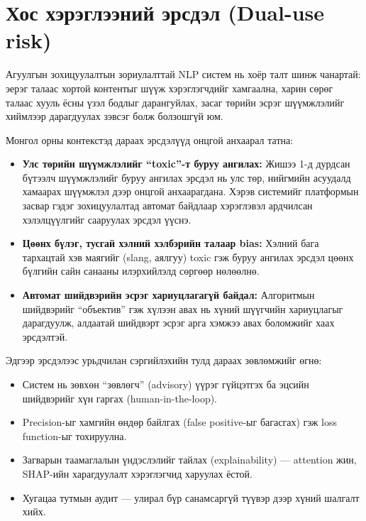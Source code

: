 \section{Хос хэрэглээний эрсдэл (Dual-use risk)}

Агуулгын зохицуулалтын зориулалттай NLP систем нь хоёр талт шинж чанартай:
эерэг талаас хортой контентыг шүүж хэрэглэгчдийг хамгаална, харин сөрөг
талаас хууль ёсны үзэл бодлыг дарангуйлах, засаг төрийн эсрэг шүүмжлэлийг
хиймлээр дарагдуулах зэвсэг болж болзошгүй юм.

Монгол орны контекстэд дараах эрсдэлүүд онцгой анхаарал татна:

\begin{itemize}
  \item \textbf{Улс төрийн шүүмжлэлийг ``toxic''-т буруу ангилах:} Жишээ 1-д
    дурдсан бүтээлч шүүмжлэлийг буруу ангилах эрсдэл нь улс төр, нийгмийн
    асуудалд хамаарах шүүмжлэл дээр онцгой анхаарагдана. Хэрэв системийг
    платформын засвар гэдэг зохицуулалтад автомат байдлаар хэрэглэвэл
    ардчилсан хэлэлцүүлгийг сааруулах эрсдэл үүснэ.
  \item \textbf{Цөөнх бүлэг, тусгай хэлний хэлбэрийн талаар bias:} Хэлний
    бага тархацтай хэв маягийг (slang, аялгуу) toxic гэж буруу ангилах
    эрсдэл цөөнх бүлгийн сайн санааны илэрхийлэлд сөргөөр нөлөөлнө.
  \item \textbf{Автомат шийдвэрийн эсрэг хариуцлагагүй байдал:} Алгоритмын
    шийдвэрийг ``объектив'' гэж хүлээн авах нь хүний шүүгчийн хариуцлагыг
    дарагдуулж, алдаатай шийдвэрт эсрэг арга хэмжээ авах боломжийг
    хаах эрсдэлтэй.
\end{itemize}

Эдгээр эрсдэлээс урьдчилан сэргийлэхийн тулд дараах зөвлөмжийг өгнө:

\begin{itemize}
  \item Систем нь зөвхөн ``зөвлөгч'' (advisory) үүрэг гүйцэтгэх ба эцсийн
    шийдвэрийг хүн гаргах (human-in-the-loop).
  \item Precision-ыг хамгийн өндөр байлгах (false positive-ыг багасгах) гэж
    loss function-ыг тохируулна.
  \item Загварын таамаглалын үндэслэлийг тайлах (explainability) --- attention
    жин, SHAP-ийн харагдуулалт хэрэглэгчид харуулах ёстой.
  \item Хугацаа тутмын аудит --- улирал бүр санамсаргүй түүвэр дээр хүний
    шалгалт хийх.
\end{itemize}

